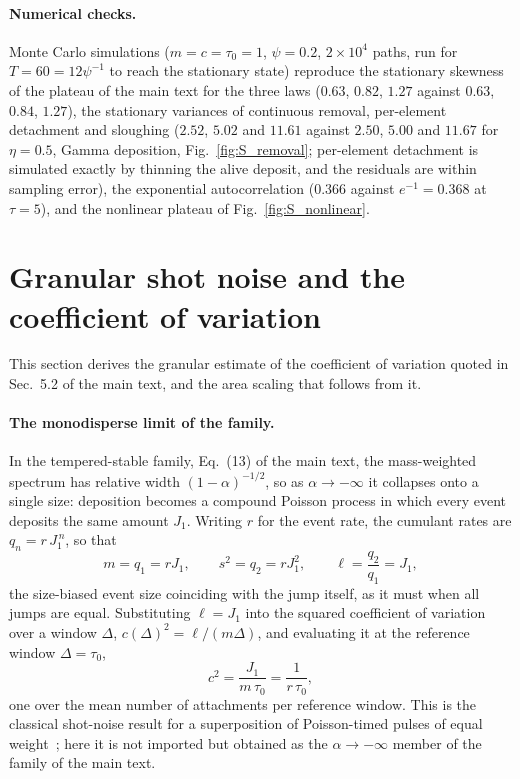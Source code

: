 \documentclass[preprint,12pt]{elsarticle}
\begin{document}
\paragraph*{Numerical checks.}
Monte Carlo simulations ($m=c=\tau_0=1$, $\psi=0.2$, $2\times10^4$ paths,
run for $T=60=12\psi^{-1}$ to reach the stationary state) reproduce the stationary skewness of the plateau of the
main text for the three laws ($0.63$, $0.82$,
$1.27$ against $0.63$, $0.84$, $1.27$), the stationary variances of continuous removal, per-element detachment and
sloughing ($2.52$, $5.02$ and $11.61$ against $2.50$, $5.00$ and $11.67$ for
$\eta=0.5$, Gamma deposition, Fig.~\ref{fig:S_removal}; per-element
detachment is simulated exactly by thinning the alive deposit, and the
residuals are within sampling error), the exponential autocorrelation ($0.366$ against
$e^{-1}=0.368$ at $\tau=5$), and the nonlinear plateau of Fig.~\ref{fig:S_nonlinear}.

\section{Granular shot noise and the coefficient of variation}
\label{app:shot_noise}

This section derives the granular estimate of the coefficient of variation
quoted in Sec.~5.2 of the main text, and the area scaling that follows from
it.

\paragraph*{The monodisperse limit of the family.}
In the tempered-stable family, Eq.~(13) of the main text, the mass-weighted spectrum
has relative width $(1-\alpha)^{-1/2}$, so as $\alpha\to-\infty$ it collapses
onto a single size: deposition becomes a compound Poisson process in which
every event deposits the same amount $J_1$. Writing $r$ for the event rate,
the cumulant rates are $q_n=r\,J_1^{\,n}$, so that
\begin{equation}
  m=q_1=r J_1,\qquad s^2=q_2=r J_1^{2},\qquad
  \ell=\frac{q_2}{q_1}=J_1 ,
  \label{eq:S_mono}
\end{equation}
the size-biased event size coinciding with the jump itself, as it must when
all jumps are equal. Substituting $\ell=J_1$ into the squared coefficient of
variation over a window $\Delta$, $c(\Delta)^2=\ell/(m\Delta)$, and evaluating
it at the reference window $\Delta=\tau_0$,
\begin{equation}
  c^{2}=\frac{J_1}{m\,\tau_0}=\frac{1}{r\,\tau_0},
  \label{eq:S_cv_mono}
\end{equation}
one over the mean number of attachments per reference window. This is the
classical shot-noise result for a superposition of Poisson-timed pulses of
equal weight~\cite{Rice1944,Rice1945}; here it is not imported but obtained as
the $\alpha\to-\infty$ member of the family of the main text.
\end{document}
